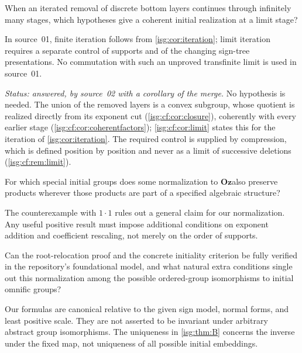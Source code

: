 \documentclass[11pt]{article}
\theoremstyle{definition}
\theoremstyle{remark}
\newcommand{\Oz}{\ensuremath{\mathbf{Oz}}}
\begin{document}
\begin{question}\label{isg:q:limit}
When an iterated removal of discrete bottom layers continues through
infinitely many stages, which hypotheses give a coherent initial
realization at a limit stage?
\end{question}
In source~01, finite iteration follows from \cref{isg:cor:iteration};
limit iteration requires a separate control of supports and of the
changing sign-tree presentations. No commutation with such an unproved
transfinite limit is used in source~01.

\emph{Status: answered, by source~02 with a corollary of the merge.} No
hypothesis is needed. The union of the removed layers is a convex
subgroup, whose quotient is realized directly from its exponent cut
(\cref{isg:cf:cor:closure}), coherently with every earlier stage
(\cref{isg:cf:cor:coherentfactors}); \cref{isg:cf:cor:limit} states this
for the iteration of \cref{isg:cor:iteration}. The required control is
supplied by compression, which is defined position by position and never
as a limit of successive deletions (\cref{isg:cf:rem:limit}).

\begin{question}\label{isg:q:multiplicative}
For which special initial groups does some normalization to \Oz also
preserve products wherever those products are part of a specified
algebraic structure?
\end{question}
The counterexample with $1\cdot1$ rules out a general claim for our
normalization. Any useful positive result must impose additional
conditions on exponent addition and coefficient rescaling, not merely
on the order of supports.

\begin{question}\label{isg:q:formal}
Can the root-relocation proof and the concrete initiality criterion be
fully verified in the repository's foundational model, and what natural
extra conditions single out this normalization among the possible
ordered-group isomorphisms to initial omnific groups?
\end{question}
Our formulas are canonical relative to the given sign model, normal
forms, and least positive scale. They are not asserted to be invariant
under arbitrary abstract group isomorphisms. The uniqueness in
\cref{isg:thm:B} concerns the inverse under the fixed map, not uniqueness of
all possible initial embeddings.
\end{document}
